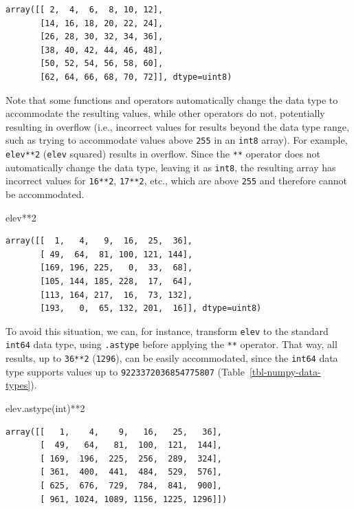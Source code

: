 \documentclass[
  letterpaper,
]{krantz}
\newenvironment{Shaded}{\begin{snugshade}}{\end{snugshade}}
\newcommand{\BuiltInTok}[1]{\textcolor[rgb]{0.00,0.23,0.31}{#1}}
\newcommand{\DecValTok}[1]{\textcolor[rgb]{0.68,0.00,0.00}{#1}}
\newcommand{\NormalTok}[1]{\textcolor[rgb]{0.00,0.23,0.31}{#1}}
\newcommand{\OperatorTok}[1]{\textcolor[rgb]{0.37,0.37,0.37}{#1}}
\begin{document}
\begin{verbatim}
array([[ 2,  4,  6,  8, 10, 12],
       [14, 16, 18, 20, 22, 24],
       [26, 28, 30, 32, 34, 36],
       [38, 40, 42, 44, 46, 48],
       [50, 52, 54, 56, 58, 60],
       [62, 64, 66, 68, 70, 72]], dtype=uint8)
\end{verbatim}

Note that some functions and operators automatically change the data
type to accommodate the resulting values, while other operators do not,
potentially resulting in overflow (i.e., incorrect values for results
beyond the data type range, such as trying to accommodate values above
\texttt{255} in an \texttt{int8} array). For example, \texttt{elev**2}
(\texttt{elev} squared) results in overflow. Since the \texttt{**}
operator does not automatically change the data type, leaving it as
\texttt{int8}, the resulting array has incorrect values for
\texttt{16**2}, \texttt{17**2}, etc., which are above \texttt{255} and
therefore cannot be accommodated.

\begin{Shaded}
\begin{Highlighting}[]
\NormalTok{elev}\OperatorTok{**}\DecValTok{2}
\end{Highlighting}
\end{Shaded}

\begin{verbatim}
array([[  1,   4,   9,  16,  25,  36],
       [ 49,  64,  81, 100, 121, 144],
       [169, 196, 225,   0,  33,  68],
       [105, 144, 185, 228,  17,  64],
       [113, 164, 217,  16,  73, 132],
       [193,   0,  65, 132, 201,  16]], dtype=uint8)
\end{verbatim}

To avoid this situation, we can, for instance, transform \texttt{elev}
to the standard \texttt{int64} data type, using \texttt{.astype} before
applying the \texttt{**} operator. That way, all results, up to
\texttt{36**2} (\texttt{1296}), can be easily accommodated, since the
\texttt{int64} data type supports values up to
\texttt{9223372036854775807} (Table~\ref{tbl-numpy-data-types}).

\begin{Shaded}
\begin{Highlighting}[]
\NormalTok{elev.astype(}\BuiltInTok{int}\NormalTok{)}\OperatorTok{**}\DecValTok{2}
\end{Highlighting}
\end{Shaded}

\begin{verbatim}
array([[   1,    4,    9,   16,   25,   36],
       [  49,   64,   81,  100,  121,  144],
       [ 169,  196,  225,  256,  289,  324],
       [ 361,  400,  441,  484,  529,  576],
       [ 625,  676,  729,  784,  841,  900],
       [ 961, 1024, 1089, 1156, 1225, 1296]])
\end{verbatim}
\end{document}
